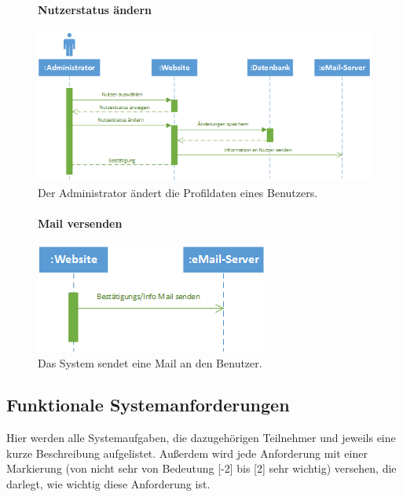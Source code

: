 \documentclass[12pt,a4paper]{article}
\begin{document}
\begin{figure}[H]
	\centering
	\paragraph{Nutzerstatus ändern}
	\includegraphics[width=\textwidth]{Bilder/Sequenzdiagramme/NutzerstatusAendern.png}
	\caption{Der Administrator ändert die Profildaten eines Benutzers.}
	\label{SzNutzerstatusAendern}
\end{figure}

\begin{figure}[H]
	\centering
	\paragraph{Mail versenden}
	\includegraphics[width=\textwidth]{Bilder/Sequenzdiagramme/MailVersenden.png}
	\caption{Das System sendet eine Mail an den Benutzer.}
	\label{SzMailVersenden}
\end{figure}


\subsection{Funktionale Systemanforderungen}
Hier werden alle Systemaufgaben, die dazugehörigen Teilnehmer und jeweils eine kurze Beschreibung aufgelistet. Außerdem wird jede Anforderung mit einer Markierung (von nicht sehr von Bedeutung [-2]  bis [2] sehr wichtig) versehen, die darlegt, wie wichtig diese Anforderung ist.
\end{document}
